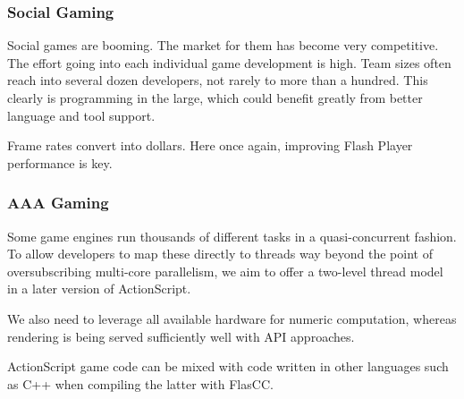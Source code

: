 \subsubsection{Social Gaming}
Social games are booming. The market for them has become very competitive. The
effort going into each individual game development is high. Team sizes often
reach into several dozen developers, not rarely to more than a hundred.
This clearly is programming in the large, which could benefit greatly from
better language and tool support.

Frame rates convert into dollars. Here once again, improving Flash
Player performance is key.

\subsubsection{AAA Gaming}

Some game engines run thousands of different tasks in a quasi-concurrent
fashion. To allow developers to map these directly to threads way beyond the
point of oversubscribing multi-core parallelism, we aim to offer a two-level
thread model in a later version of ActionScript.

We also need to leverage all available hardware for numeric computation,
whereas rendering is being served sufficiently well with API approaches.

ActionScript game code can be mixed with code written in other languages
such as C++ when compiling the latter with FlasCC.

